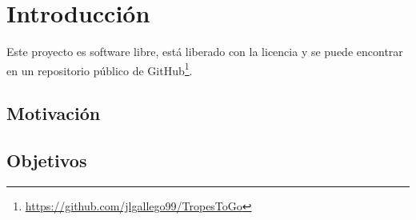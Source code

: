 \chapter{Introducción}

Este proyecto es software libre, está liberado con la licencia \cite{gplv3} y se puede encontrar en un repositorio público de GitHub\footnote{\url{https://github.com/jlgallego99/TropesToGo}}.

\section{Motivación}
\section{Objetivos}